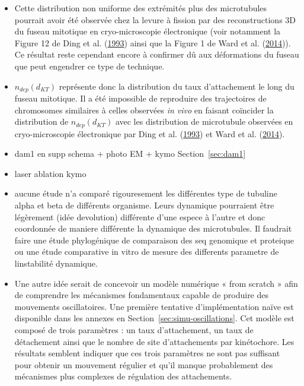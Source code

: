 \documentclass[12pt,a4paper,twoside,openright]{book}
\begin{document}
\begin{itemize}
\item
  Cette distribution non uniforme des extrémités plus des microtubules
  pourrait avoir été observée chez la levure à fission par des
  reconstructions 3D du fuseau mitotique en cryo-microscopie
  électronique (voir notamment la Figure 12 de Ding et al.
  (\hyperref[ref-Ding1993a]{1993}) ainsi que la Figure 1 de Ward et al.
  (\hyperref[ref-Ward2014]{2014})). Ce résultat reste cependant encore à
  confirmer dû aux déformations du fuseau que peut engendrer ce type de
  technique.
\item
  \(n_{dep}(d_{KT})\) représente donc la distribution du taux
  d'attachement le long du fuseau mitotique. Il a été impossible de
  reproduire des trajectoires de chromosomes similaires à celles
  observées \emph{in vivo} en faisant coïncider la distribution de
  \(n_{dep}(d_{KT})\) avec les distribution de microtubule observées en
  cryo-microscopie électronique par Ding et al.
  (\hyperref[ref-Ding1993a]{1993}) et Ward et al.
  (\hyperref[ref-Ward2014]{2014}).
\item
  dam1 en supp schema + photo EM + kymo Section~\ref{sec:dam1}
\item
  laser ablation kymo
\item
  aucune étude n'a comparé rigouresement les différentes type de
  tubuline alpha et beta de différents organisme. Leurs dynamique
  pourraient être légèrement (idée devolution) différente d'une espece à
  l'autre et donc coordonnée de maniere différente la dynamique des
  microtubules. Il faudrait faire une étude phylogénique de comparaison
  des seq genomique et proteique ou une étude comparative in vitro de
  mesure des differents parametre de linstabilité dynamique.
\item
  Une autre idée serait de concevoir un modèle numérique « from scratch
  » afin de comprendre les mécanismes fondamentaux capable de produire
  des mouvements oscillatoires. Une première tentative d'implémentation
  naïve est disponible dans les annexes en
  Section~\ref{sec:simu-oscillations}. Cet modèle est composé de trois
  paramètres : un taux d'attachement, un taux de détachement ainsi que
  le nombre de site d'attachements par kinétochore. Les résultats
  semblent indiquer que ces trois paramètres ne sont pas suffisant pour
  obtenir un mouvement régulier et qu'il manque probablement des
  mécanismes plus complexes de régulation des attachements.
\end{itemize}
\end{document}
